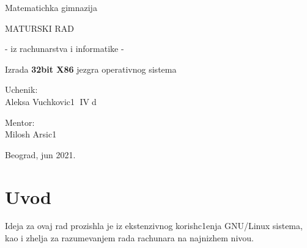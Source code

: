 \documentclass[a4paper,fleqn,12pt]{JMThesis}
\newcommand\eng{\fontencoding{OT1}\fontfamily{\rmdefault}\selectfont}
\begin{document}
\thispagestyle{empty}

\begin{center}
{\matematicka Matematichka gimnazija}
\end{center}
\vspace*{50mm}

\begin{center}
{\maturski MATURSKI RAD}

\vspace*{8pt}
{\naslov - iz rachunarstva i informatike -}
\end{center}

\vspace*{10pt}
\begin{center}
    {\naslov Izrada \textbf{\eng\Large 32bit X86} jezgra operativnog sistema}
\end{center}

\vspace*{70mm}
\setlength{\columnsep}{50pt}
\begin{multicols}{2}
 {\noindent \imen Uchenik:
\\Aleksa Vuchkovic1  $\operatorname{IV}$d}


{ \noindent \hfill \imen Mentor:\\
\hfill \phantom{aaaaaaaa} Milosh Arsic1}
\end{multicols}

\vfill
\begin{center}
{\imen Beograd, jun 2021.}
\end{center}
\clearpage

\thispagestyle{empty}
\mbox{}
\clearpage


\renewcommand{\contentsname}{Sadrzhaj}
\thispagestyle{empty}


\tableofcontents \clearpage

\thispagestyle{empty}
\mbox{}
\clearpage

\renewcommand{\chaptername}{}
\setcounter{page}{1}

\chapter{Uvod}
\bigskip

Ideja za ovaj rad prozishla je iz ekstenzivnog korish\/c1enja {\eng GNU/Linux}
sistema, kao i zhelja za razumevanjem rada rachunara na najnizhem nivou.
\end{document}
